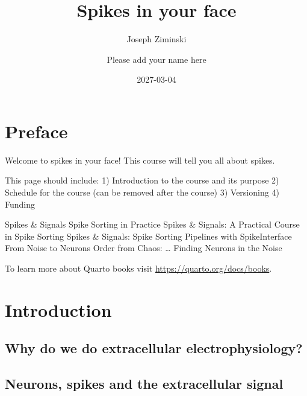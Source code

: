 \documentclass[
  letterpaper,
  DIV=11,
  numbers=noendperiod]{scrreprt}
\title{Spikes in your face}
\author{Joseph Ziminski \and Please add your name here}
\date{2027-03-04}
\renewcommand*\contentsname{Table of contents}
\newcommand\contentsname{Table of contents}
\begin{document}
\maketitle

\renewcommand*\contentsname{Table of contents}
{
\setcounter{tocdepth}{2}
\tableofcontents
}


\chapter*{Preface}\label{preface}


Welcome to spikes in your face! This course will tell you all about
spikes.

This page should include: 1) Introduction to the course and its purpose
2) Schedule for the course (can be removed after the course) 3)
Versioning 4) Funding

Spikes \& Signals Spike Sorting in Practice Spikes \& Signals: A
Practical Course in Spike Sorting Spikes \& Signals: Spike Sorting
Pipelines with SpikeInterface From Noise to Neurons Order from Chaos:
\ldots{} Finding Neurons in the Noise

To learn more about Quarto books visit
\url{https://quarto.org/docs/books}.


\chapter*{Introduction}\label{introduction}


\section*{Why do we do extracellular
electrophysiology?}\label{why-do-we-do-extracellular-electrophysiology}


\section*{Neurons, spikes and the extracellular
signal}\label{neurons-spikes-and-the-extracellular-signal}
\end{document}
